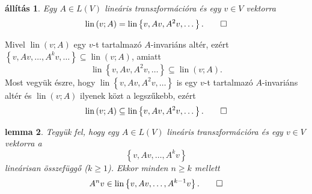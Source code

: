 \documentclass[9pt, a4paper, showtrims]{memoir}
\makeatletter
\renewenvironment{proof}[1][\proofname]
    {\par\pushQED{\qed}%
    \normalfont \topsep6\p@\@plus6\p@\relax
    \trivlist
    \item[\hskip\labelsep
        \itshape
    #1\@addpunct{:}]\ignorespaces}
    {\popQED\endtrivlist\@endpefalse}
\theoremstyle{plain}
\newtheorem{proposition}{állítás}[chapter]
\newtheorem{lemma}[proposition]{lemma}
\theoremstyle{remark}
\theoremstyle{definition}
\DeclareMathOperator{\lin}{lin}
\makeatother
\begin{document}
    \begin{proposition}
        Egy $A\in L\left( V \right)$ lineáris transzformációra és egy $v\in V$ vektorra
        \[
            \lin\left( v;A \right)
            =
            \lin\left\{ v,Av,A^2v,\dots \right\}.\qedhere
        \]
    \end{proposition}
    \begin{proof}
        Mivel $\lin\left( v;A \right)$ egy $v$-t tartalmazó $A$-invariáns altér,
        ezért $\left\{ v,Av,\dots,A^kv,\dots \right\}\subseteq \lin\left( v;A \right)$,
        amiatt
        \[
            \lin\left\{ v,Av,A^2v,\dots \right\}
            \subseteq
            \lin\left( v;A \right).
        \]
        Most vegyük észre, hogy 
        \begin{math}
            \lin\left\{ v,Av,A^2v,\dots \right\}
        \end{math}
        is egy $v$-t tartalmazó $A$-invariáns altér és $\lin\left( v;A \right)$ ilyenek közt a legszűkebb, ezért
        \[
            \lin\left( v;A \right)
            \subseteq
            \lin\left\{ v,Av,A^2v,\dots \right\}.\qedhere
        \]
    \end{proof}
    \begin{lemma}
        Tegyük fel, hogy egy $A\in L\left( V \right)$ lineáris transzformációra és egy 
        $v\in V$ vektorra a 
        \[
            \left\{ v,Av,\dots,A^kv \right\}
        \]
        lineárisan összefüggő ($k\geq 1$).
        Ekkor minden $n\geq k$ mellett
        \[
            A^nv\in\lin\left\{ v,Av,\dots,A^{k-1}v \right\}.\qedhere
        \]
        \label{le:of}
    \end{lemma}
\end{document}
